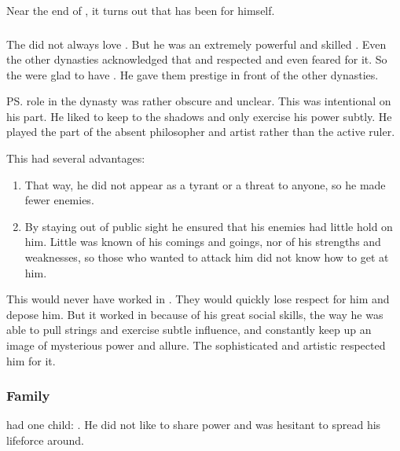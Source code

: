 Near the end of \SentinelsofMiithEmph, it turns out that \Azraid{} has been  for himself.





\subsubsection{\CiriathSepher}
The \CiriathSepher did not always love \Azraid.
But he was an extremely powerful and skilled \sathariah. 
Even the other dynasties acknowledged that and respected and even feared \Azraid for it.
So the \CiriathSepher were glad to have \Azraid.
He gave them prestige in front of the other dynasties.

\ps{\Azraid} role in the dynasty was rather obscure and unclear. 
This was intentional on his part. 
He liked to keep to the shadows and only exercise his power subtly. 
He played the part of the absent philosopher and artist rather than the active ruler. 

This had several advantages:

\begin{enumerate}
  \item 
    That way, he did not appear as a tyrant or a threat to anyone, so he made fewer enemies. 
  \item 
    By staying out of public sight he ensured that his enemies had little hold on him. 
    Little was known of his comings and goings, nor of his strengths and weaknesses, so those who wanted to attack him did not know how to get at him. 
\end{enumerate}

This  would never have worked in \Mystraacht. 
They would quickly lose respect for him and depose him. 
But it worked in \CiriathSepher{} because of his great social skills, the way he was able to pull strings and exercise subtle influence, and constantly keep up an image of mysterious power and allure. 
The sophisticated and artistic \CiriathSepher{} respected him for it. 





\subsubsection{Family}
\Azraid{} had one child: . 
He did not like to share power and was hesitant to spread his lifeforce around. 







